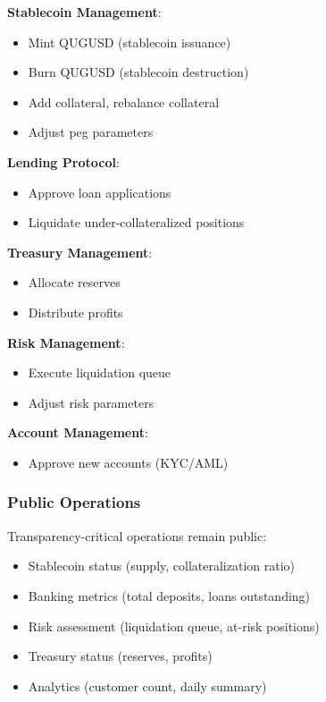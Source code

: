 \documentclass[11pt,a4paper]{article}
\begin{document}
\begin{tcolorbox}[colback=qnkpurple!5,colframe=qnkpurple,title=Founder-Only Operations]
\textbf{Stablecoin Management}:
\begin{itemize}[nosep]
    \item Mint QUGUSD (stablecoin issuance)
    \item Burn QUGUSD (stablecoin destruction)
    \item Add collateral, rebalance collateral
    \item Adjust peg parameters
\end{itemize}

\textbf{Lending Protocol}:
\begin{itemize}[nosep]
    \item Approve loan applications
    \item Liquidate under-collateralized positions
\end{itemize}

\textbf{Treasury Management}:
\begin{itemize}[nosep]
    \item Allocate reserves
    \item Distribute profits
\end{itemize}

\textbf{Risk Management}:
\begin{itemize}[nosep]
    \item Execute liquidation queue
    \item Adjust risk parameters
\end{itemize}

\textbf{Account Management}:
\begin{itemize}[nosep]
    \item Approve new accounts (KYC/AML)
\end{itemize}
\end{tcolorbox}

\subsubsection{Public Operations}

Transparency-critical operations remain public:

\begin{itemize}[leftmargin=*]
    \item Stablecoin status (supply, collateralization ratio)
    \item Banking metrics (total deposits, loans outstanding)
    \item Risk assessment (liquidation queue, at-risk positions)
    \item Treasury status (reserves, profits)
    \item Analytics (customer count, daily summary)
\end{itemize}
\end{document}
